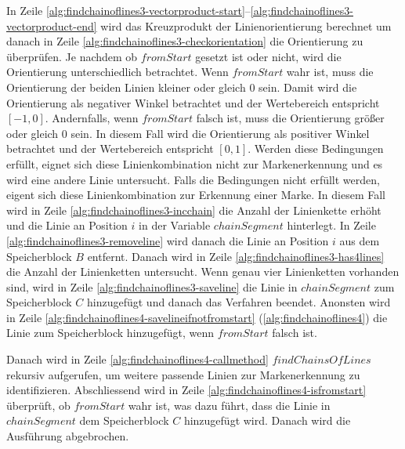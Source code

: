 In Zeile \ref{alg:findchainoflines3-vectorproduct-start}--\ref{alg:findchainoflines3-vectorproduct-end} wird das
 Kreuzprodukt der Linienorientierung berechnet um danach in Zeile \ref{alg:findchainoflines3-checkorientation} die
 Orientierung zu überprüfen. Je nachdem ob $\mathit{fromStart}$ gesetzt ist oder nicht, wird die Orientierung
 unterschiedlich betrachtet. Wenn $\mathit{fromStart}$ wahr ist, muss die Orientierung der beiden Linien kleiner oder
 gleich $0$ sein. Damit wird die Orientierung als negativer Winkel betrachtet und der Wertebereich entspricht
 $\left[-1,0\right]$. Andernfalls, wenn $\mathit{fromStart}$ falsch ist, muss die Orientierung größer oder gleich $0$
 sein. In diesem Fall wird die Orientierung als positiver Winkel betrachtet und der Wertebereich entspricht
 $\left[0,1\right]$. Werden diese Bedingungen erfüllt, eignet sich diese Linienkombination nicht zur Markenerkennung
 und es wird eine andere Linie untersucht. Falls die Bedingungen nicht erfüllt werden, eigent sich diese
 Linienkombination zur Erkennung einer Marke. In diesem Fall wird in Zeile \ref{alg:findchainoflines3-incchain} die
 Anzahl der Linienkette erhöht und die Linie an Position $i$ in der Variable $\mathit{chainSegment}$ hinterlegt. In
 Zeile \ref{alg:findchainoflines3-removeline} wird danach die Linie an Position $i$ aus dem Speicherblock $B$ entfernt.
 Danach wird in Zeile \ref{alg:findchainoflines3-has4lines} die Anzahl der Linienketten untersucht. Wenn genau vier
 Linienketten vorhanden sind, wird in Zeile \ref{alg:findchainoflines3-saveline} die Linie in $\mathit{chainSegment}$
 zum Speicherblock $C$ hinzugefügt und danach das Verfahren beendet. Anonsten wird in Zeile
 \ref{alg:findchainoflines4-savelineifnotfromstart} (\autoref{alg:findchainoflines4}) die Linie zum Speicherblock
 hinzugefügt, wenn $\mathit{fromStart}$ falsch ist.



Danach wird in Zeile \ref{alg:findchainoflines4-callmethod} $\mathit{findChainsOfLines}$ rekursiv aufgerufen, um
 weitere passende Linien zur Markenerkennung zu identifizieren. Abschliessend wird in Zeile
 \ref{alg:findchainoflines4-isfromstart} überprüft, ob $\mathit{fromStart}$ wahr ist, was dazu führt, dass die Linie in
 $\mathit{chainSegment}$ dem Speicherblock $C$ hinzugefügt wird. Danach wird die Ausführung abgebrochen.
